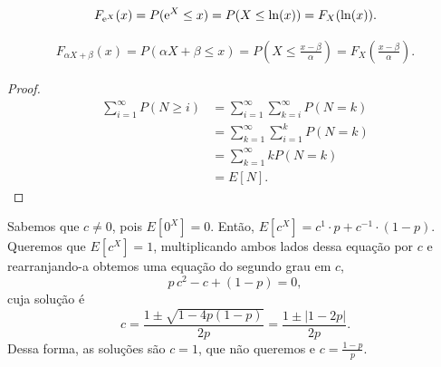 \begin{questions}

\setcounter{question}{1}
\begin{solution}
	\begin{align*}
		F_{\mathrm{e}^X}(x)
        	= P(\mathrm{e}^X \le x)
            = P(X \le \ln(x))
            = F_X(\ln(x)).
	\end{align*}
\end{solution}

\begin{solution}
	\begin{align*}
		F_{\alpha X + \beta}(x)
        	= P(\alpha X + \beta \le x)
            = P\left(X \le \frac{x-\beta}{\alpha}\right)
            = F_X\left(\frac{x-\beta}{\alpha}\right).
	\end{align*}
\end{solution}

\begin{solution}
\begin{proof}
	\begin{align*}
		\sum_{i=1}^\infty P(N\ge i)
        	&= \sum_{i=1}^\infty \sum_{k=i}^\infty P(N = k)\\
            &= \sum_{k=1}^\infty \sum_{i=1}^k P(N = k)\\
            &= \sum_{k=1}^\infty k P(N = k)\\
            &= E[N].
	\end{align*}
\end{proof}
\end{solution}

\setcounter{question}{5}
\begin{solution} Sabemos que $c\neq 0$, pois $E[0^X] = 0$. Então, $E[c^X] = c^1\cdot p + c^{-1}\cdot(1-p)$. Queremos que $E[c^X] = 1$, multiplicando ambos lados dessa equação por $c$ e rearranjando-a obtemos uma equação do segundo grau em $c$, \[p\,c^2-c+(1-p) = 0,\] cuja solução é \[c = \frac{1\pm \sqrt{1-4p(1-p)}}{2p} = \frac{1\pm|1-2p|}{2p}.\]
Dessa forma, as soluções são $c=1$, que não queremos e $c = \frac{1-p}{p}$.
\end{solution}


\end{questions}
